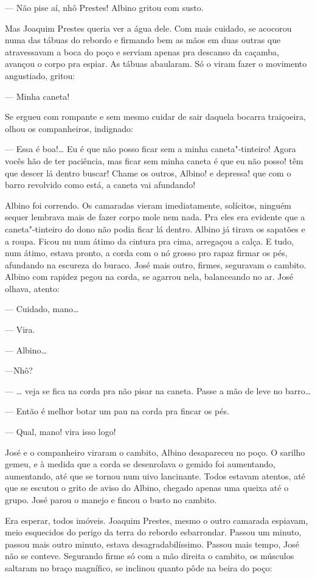 \begin{linenumbers}
--- Não pise aí, nhô Prestes! Albino gritou com susto.

Mas Joaquim Prestes queria ver a água dele. Com mais cuidado, se
acocorou numa das tábuas do rebordo e firmando bem as mãos em duas
outras que atravessavam a boca do poço e serviam apenas pra descanso da
caçamba, avançou o corpo pra espiar. As tábuas abaularam. Só o viram
fazer o movimento angustiado, gritou:

--- Minha caneta!

Se ergueu com rompante e sem mesmo cuidar de sair daquela bocarra
traiçoeira, olhou os companheiros, indignado:

--- Essa é boa!\ldots{} Eu é que não posso ficar sem a minha caneta"-tinteiro!
Agora vocês hão de ter paciência, mas ficar sem minha caneta é que eu
não posso! têm que descer lá dentro buscar! Chame os outros, Albino! e
depressa! que com o barro revolvido como está, a caneta vai afundando!

Albino foi correndo. Os camaradas vieram imediatamente, solícitos,
ninguém sequer lembrava mais de fazer corpo mole nem nada. Pra eles era
evidente que a caneta"-tinteiro do dono não podia ficar lá dentro. Albino
já tirava os sapatões e a roupa. Ficou nu num átimo da cintura pra cima,
arregaçou a calça. E tudo, num átimo, estava pronto, a corda com o nó
grosso pro rapaz firmar os pés, afundando na escureza do buraco. José
mais outro, firmes, seguravam o cambito. Albino com rapidez pegou na
corda, se agarrou nela, balanceando no ar. José olhava, atento:

--- Cuidado, mano\ldots{}

--- Vira.

--- Albino\ldots{}

---Nhô?

--- \ldots{} veja se fica na corda pra não pisar na caneta. Passe a mão de
leve no barro\ldots{}

--- Então é melhor botar um pau na corda pra fincar os pés.

--- Qual, mano! vira isso logo!

José e o companheiro viraram o cambito, Albino desapareceu no poço. O
sarilho gemeu, e à medida que a corda se desenrolava o gemido foi
aumentando, aumentando, até que se tornou num uivo lancinante. Todos
estavam atentos, até que se escutou o grito de aviso do Albino, chegado
apenas uma queixa até o grupo. José parou o manejo e fincou o busto no
cambito.

Era esperar, todos imóveis. Joaquim Prestes, mesmo o outro camarada
espiavam, meio esquecidos do perigo da terra do rebordo esbarrondar.
Passou um minuto, passou mais outro minuto, estava desagradabilíssimo.
Passou mais tempo, José não se conteve. Segurando firme só com a mão
direita o cambito, os músculos saltaram no braço magnífico, se inclinou
quanto pôde na beira do poço:


\end{linenumbers}
